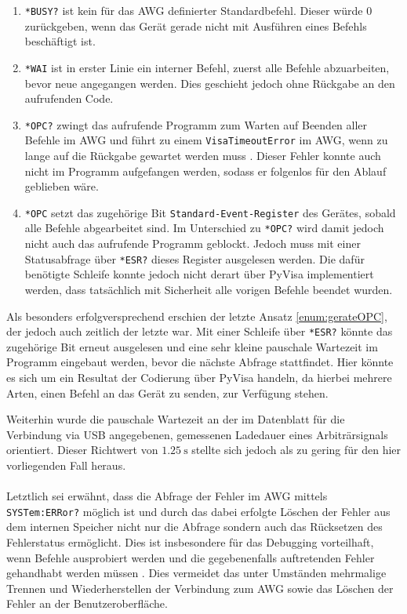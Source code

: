 \documentclass[../Report.tex]{subfiles}
\begin{document}
\begin{enumerate}
	\item \lstinline{*BU}\lstinline{SY?} ist kein für das AWG definierter Standardbefehl. Dieser würde 0 zurückgeben, wenn das Gerät gerade nicht mit Ausführen eines Befehls beschäftigt ist.
	
	\item \lstinline{*WA}\lstinline{I} ist in erster Linie ein interner Befehl, zuerst alle Befehle abzuarbeiten, bevor neue angegangen werden. Dies geschieht jedoch ohne Rückgabe an den aufrufenden Code.
	
	\item \lstinline{*OPC?} zwingt das aufrufende Programm zum Warten auf Beenden aller Befehle im AWG und führt zu einem \lstinline{VisaTimeoutError} im AWG, wenn zu lange auf die Rückgabe gewartet werden muss \cite[S. 9]{troeser13}. Dieser Fehler konnte auch nicht im Programm aufgefangen werden, sodass er folgenlos für den Ablauf geblieben wäre.
	
	\item \label{enum:gerateOPC}\lstinline{*OPC} setzt das zugehörige Bit \lstinline{Standard-Event-Register} des Gerätes, sobald alle Befehle abgearbeitet sind. Im Unterschied zu \lstinline{*OPC?} wird damit jedoch nicht auch das aufrufende Programm geblockt. Jedoch muss mit einer Statusabfrage über \lstinline{*ESR?} dieses Register ausgelesen werden. Die dafür benötigte Schleife konnte jedoch nicht derart über PyVisa implementiert werden, dass tatsächlich mit Sicherheit alle vorigen Befehle beendet wurden.

\end{enumerate}

Als besonders erfolgversprechend erschien der letzte Ansatz \ref{enum:gerateOPC}, der jedoch auch zeitlich der letzte war. Mit einer Schleife über \lstinline{*ES}\lstinline{R?} könnte das zugehörige Bit erneut ausgelesen und eine sehr kleine pauschale Wartezeit im Programm eingebaut werden, bevor die nächste Abfrage stattfindet. Hier könnte es sich um ein Resultat der Codierung über PyVisa handeln, da hierbei mehrere Arten, einen Befehl an das Gerät zu senden, zur Verfügung stehen.

Weiterhin wurde die pauschale Wartezeit an der im Datenblatt \cite[S. 21]{keysData14} für die Verbindung via USB angegebenen, gemessenen Ladedauer eines Arbiträrsignals orientiert. Dieser Richtwert von $\SI{1.25}{\s}$ stellte sich jedoch als zu gering für den hier vorliegenden Fall heraus.
\\
\\
Letztlich sei erwähnt, dass die Abfrage der Fehler im AWG mittels  \lstinline{SYSTem:ERRor?} möglich ist und durch das dabei erfolgte Löschen der Fehler aus dem internen Speicher nicht nur die Abfrage sondern auch das Rücksetzen des Fehlerstatus ermöglicht. Dies ist insbesondere für das Debugging vorteilhaft, wenn Befehle ausprobiert werden und die gegebenenfalls auftretenden Fehler gehandhabt werden müssen \cite[S. 454]{keysHand15}. Dies vermeidet das unter Umständen mehrmalige Trennen und Wiederherstellen der Verbindung zum AWG sowie das Löschen der Fehler an der Benutzeroberfläche.
\end{document}
